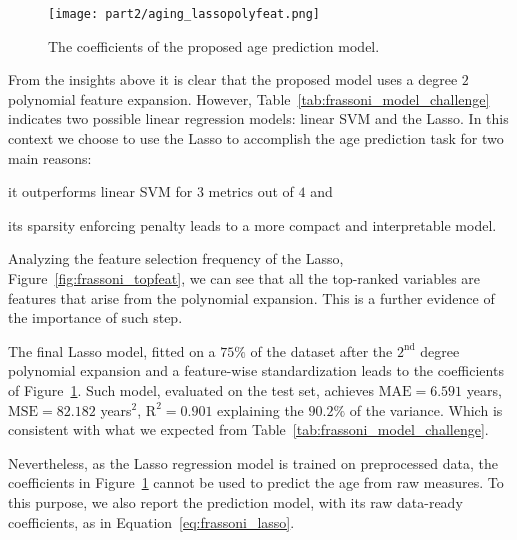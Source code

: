 \begin{figure}[h!]
	\centering
	\texttt{[image: part2/aging\_lassopolyfeat.png]}
	\caption{The coefficients of the proposed age prediction model.} \label{fig:frassoni_topmodel}
\end{figure}

From the insights above it is clear that the proposed model uses a degree $2$ polynomial feature expansion. However, Table~\ref{tab:frassoni_model_challenge} indicates two possible linear regression models: linear SVM and the Lasso. In this context we choose to use the Lasso to accomplish the age prediction task for two main reasons:
\begin{enumerate*}[label=(\roman*)]
	\item it outperforms linear SVM for $3$ metrics out of $4$ and
	\item its sparsity enforcing penalty leads to a more compact and interpretable model.
\end{enumerate*}

Analyzing the feature selection frequency of the Lasso, Figure~\ref{fig:frassoni_topfeat}, we can see that all the top-ranked variables are features that arise from the polynomial expansion. This is a further evidence of the importance of such step.

The final Lasso model, fitted on a $75\%$ of the dataset after the $2^{\text{nd}}$ degree polynomial expansion and a feature-wise standardization leads to the coefficients of Figure~\ref{fig:frassoni_topmodel}. Such model, evaluated on the test set, achieves $\text{MAE}=6.591$ years, $\text{MSE} = 82.182$ years$^2$, $\text{R}^2 = 0.901$ explaining the $90.2\%$ of the variance. Which is consistent with what we expected from Table~\ref{tab:frassoni_model_challenge}.

Nevertheless, as the Lasso regression model is trained on preprocessed data, the coefficients in Figure~\ref{fig:frassoni_topmodel} cannot be used to predict the age from raw measures. To this purpose, we also report the prediction model, with its raw data-ready coefficients, as in Equation~\eqref{eq:frassoni_lasso}.

